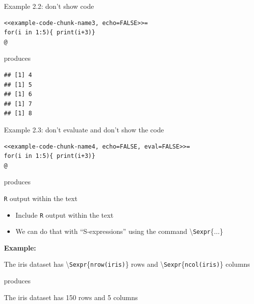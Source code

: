 \documentclass[10pt]{beamer}\usepackage[]{graphicx}\usepackage[]{color}
\makeatletter
\newenvironment{kframe}{%
 \def\at@end@of@kframe{}%
 \ifinner\ifhmode%
  \def\at@end@of@kframe{\end{minipage}}%
  \begin{minipage}{\columnwidth}%
 \fi\fi%
 \def\FrameCommand##1{\hskip\@totalleftmargin \hskip-\fboxsep
 \colorbox{shadecolor}{##1}\hskip-\fboxsep
     \hskip-\linewidth \hskip-\@totalleftmargin \hskip\columnwidth}%
 \MakeFramed {\advance\hsize-\width
   \@totalleftmargin\z@ \linewidth\hsize
   \@setminipage}}%
 {\par\unskip\endMakeFramed%
 \at@end@of@kframe}
\newenvironment{knitrout}{}{} %
\makeatother
\begin{document}
\begin{frame}[fragile]{Example 2.2: don't show code}
\begin{knitrout}
\color{fgcolor}\begin{kframe}
\begin{verbatim}
<<example-code-chunk-name3, echo=FALSE>>=
for(i in 1:5){ print(i+3)}
@
\end{verbatim}
\end{kframe}
\end{knitrout}
produces
\begin{knitrout}
\color{fgcolor}\begin{kframe}
\begin{verbatim}
## [1] 4
## [1] 5
## [1] 6
## [1] 7
## [1] 8
\end{verbatim}
\end{kframe}
\end{knitrout}

\end{frame}


\begin{frame}[fragile]{Example 2.3: don't evaluate and don't show the code}
\begin{knitrout}
\color{fgcolor}\begin{kframe}
\begin{verbatim}
<<example-code-chunk-name4, echo=FALSE, eval=FALSE>>=
for(i in 1:5){ print(i+3)}
@
\end{verbatim}
\end{kframe}
\end{knitrout}
produces


\end{frame}



\begin{frame}[fragile]{\texttt{R} output within the text}
\begin{itemize}
\item Include \texttt{R} output within the text
\item We can do that with ``S-expressions'' using the command \textbackslash \texttt{Sexpr}\{$\ldots$\}
\end{itemize}
\vspace{1cm}

\textbf{Example:} \vspace{0.3cm}

The iris dataset has \textbackslash \texttt{Sexpr}\{\texttt{nrow(iris)}\} rows and \textbackslash \texttt{Sexpr}\{\texttt{ncol(iris)}\} columns
\vspace{0.5cm}

produces \vspace{0.5cm}

The iris dataset has 150 rows and 5 columns


\end{frame}
\end{document}
